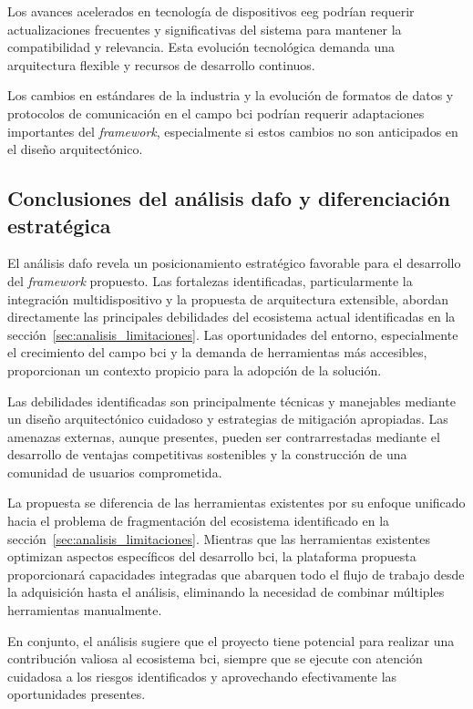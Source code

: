 Los avances acelerados en tecnología de dispositivos \acrshort{eeg} podrían requerir actualizaciones frecuentes y significativas del sistema para mantener la compatibilidad y relevancia. Esta evolución tecnológica demanda una arquitectura flexible y recursos de desarrollo continuos.

Los cambios en estándares de la industria y la evolución de formatos de datos y protocolos de comunicación en el campo \acrshort{bci} podrían requerir adaptaciones importantes del \textit{\gls{framework}}, especialmente si estos cambios no son anticipados en el diseño arquitectónico.

\subsection{Conclusiones del análisis \acrshort{dafo} y diferenciación estratégica}
\label{subsec:conclusiones_dafo}

El análisis \acrshort{dafo} revela un posicionamiento estratégico favorable para el desarrollo del \textit{\gls{framework}} propuesto. Las fortalezas identificadas, particularmente la integración multidispositivo y la propuesta de arquitectura extensible, abordan directamente las principales debilidades del ecosistema actual identificadas en la sección~\ref{sec:analisis_limitaciones}. Las oportunidades del entorno, especialmente el crecimiento del campo \acrshort{bci} y la demanda de herramientas más accesibles, proporcionan un contexto propicio para la adopción de la solución.

Las debilidades identificadas son principalmente técnicas y manejables mediante un diseño arquitectónico cuidadoso y estrategias de mitigación apropiadas. Las amenazas externas, aunque presentes, pueden ser contrarrestadas mediante el desarrollo de ventajas competitivas sostenibles y la construcción de una comunidad de usuarios comprometida.

La propuesta se diferencia de las herramientas existentes por su enfoque unificado hacia el problema de fragmentación del ecosistema identificado en la sección~\ref{sec:analisis_limitaciones}. Mientras que las herramientas existentes optimizan aspectos específicos del desarrollo \acrshort{bci}, la plataforma propuesta proporcionará capacidades integradas que abarquen todo el flujo de trabajo desde la adquisición hasta el análisis, eliminando la necesidad de combinar múltiples herramientas manualmente.

En conjunto, el análisis sugiere que el proyecto tiene potencial para realizar una contribución valiosa al ecosistema \acrshort{bci}, siempre que se ejecute con atención cuidadosa a los riesgos identificados y aprovechando efectivamente las oportunidades presentes.

